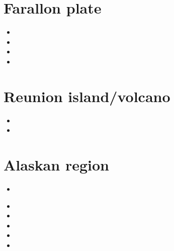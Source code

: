 \section{Farallon plate} 

\begin{small}
\begin{itemize}
\item[\twothousandeight]
\item[\twothousandeleven]
\item[\twothousandtwelve]
\item[\twothousandsixteen]
\end{itemize}
\end{small}

\section{Reunion island/volcano}

\begin{small}
\begin{itemize}
\item[\twothousandseventeen]
\item[\twothousandtwentytwo]
\end{itemize}
\end{small}

\section{Alaskan region} 

\begin{small}
\begin{itemize}
\item[\twothousandten] 
  \\
\item[\twothousandtwelve] 
\item[\twothousandthirteen] 
\item[\twothousandfifteen] 
\item[\twothousandseventeen] 
\item[\twothousandeighteen] 
\end{itemize}
\end{small}

